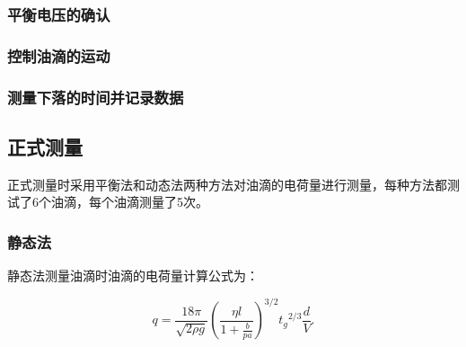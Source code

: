 \documentclass[c5size,amstex,a4paper,twoside]{ctexart}
\begin{document}
\subsubsection{平衡电压的确认}
\subsubsection{控制油滴的运动}
\subsubsection{测量下落的时间并记录数据}

\subsection{正式测量}
正式测量时采用平衡法和动态法两种方法对油滴的电荷量进行测量，每种方法都测试了6个油滴，每个油滴测量了5次。
\subsubsection{静态法}
静态法测量油滴时油滴的电荷量计算公式为：

\[q = \frac{18\pi}{\sqrt{2\rho g}} {{\left( \frac{\eta l}{{1 + \frac{b}{pa}}} \right)}}^{3/2} {t_g}^{2/3} \frac{d}{V}.\]
\end{document}
